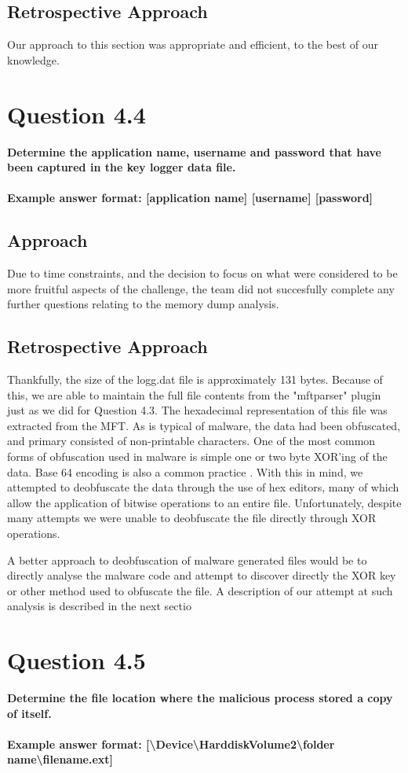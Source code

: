 \subsection{Retrospective Approach}
Our approach to this section was appropriate and efficient, to the best of our knowledge. 
\section{Question 4.4}
\textbf{Determine the application name, username and password that have been
captured in the key logger data file.
\\\\
Example answer format: [application name] [username] [password]}
\subsection{Approach}
Due to time constraints, and the decision to focus on what were considered to be more fruitful aspects of the challenge, the team did not succesfully complete any further questions relating to the memory dump analysis.

\subsection{Retrospective Approach}
Thankfully, the size of the logg.dat file is approximately 131 bytes. Because of this, we are able to maintain the full file contents from the "mftparser" plugin just as we did for Question 4.3. The hexadecimal representation of this file was extracted from the MFT. As is typical of malware, the data had been obfuscated, and primary consisted of non-printable characters. One of the most common forms of obfuscation used in malware is simple one or two byte XOR'ing of the data. Base 64 encoding is also a common practice \cite[p.441]{pracmal}. With this in mind, we attempted to deobfuscate the data through the use of hex editors, many of which allow the application of bitwise operations to an entire file. Unfortunately, despite many attempts we were unable to deobfuscate the file directly through XOR operations. 

A better approach to deobfuscation of malware generated files would be to directly analyse the malware code and attempt to discover directly the XOR key or other method used to obfuscate the file. A description of our attempt at such analysis is described in the next sectio

\section{Question 4.5}
\textbf{Determine the file location where the malicious process stored a copy of
itself.
\\\\
Example answer format:
[\textbackslash{}Device\textbackslash{}HarddiskVolume2\textbackslash{}folder
name\textbackslash{}filename.ext]}
